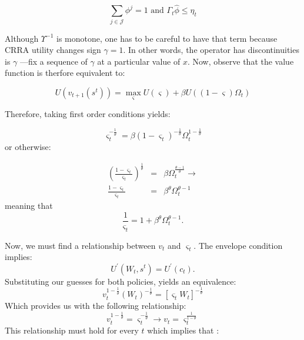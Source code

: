 \documentclass{article}
\begin{document}
\begin{equation*}
\sum_{j\in \mathcal{J}}\phi ^{j}=1\text{ and }\Gamma _{t}\hat{\phi}\leq \eta
_{t}
\end{equation*}

Although $\Upsilon ^{-1}$ is monotone, one has to be careful to have that
term because CRRA utility changes sign $\gamma =1$. In other words, the
operator has discontinuities is $\gamma $ ---fix a sequence of $\gamma $ at
a particular value of $x$. Now, observe that the value function is therfore
equivalent to:

\begin{equation*}
U\left( v_{t+1}\left( s^{t}\right) \right) =\max_{\varsigma }U\left(
\varsigma \right) +\beta U\left( \left( 1-\varsigma \right) \Omega
_{t}\right)
\end{equation*}

Therefore, taking first order conditions yields:

\begin{equation*}
\varsigma _{t}^{-\frac{1}{\theta }}=\beta \left( 1-\varsigma _{t}\right) ^{-%
\frac{1}{\theta }}\Omega _{t}^{1-\frac{1}{\theta }}
\end{equation*}%
or otherwise:

\begin{eqnarray*}
\left( \frac{1-\varsigma _{t}}{\varsigma _{t}}\right) ^{\frac{1}{\theta }}
&=&\beta \Omega _{t}^{\frac{\theta -1}{\theta }}\rightarrow \\
\frac{1-\varsigma _{t}}{\varsigma _{t}} &=&\beta ^{\theta }\Omega
_{t}^{\theta -1}
\end{eqnarray*}%
meaning that
\begin{equation*}
\frac{1}{\varsigma _{t}}=1+\beta ^{\theta }\Omega _{t}^{\theta -1}.
\end{equation*}

Now, we must find a relationship between $v_{t}$ and $\varsigma _{t}$. The
envelope condition implies:%
\begin{equation*}
U^{\prime }\left( W_{t},s^{t}\right) =U^{\prime }\left( c_{t}\right) .
\end{equation*}%
Substituting our guesses for both policies, yields an equivalence:%
\begin{equation*}
v_{t}^{1-\frac{1}{\theta }}\left( W_{t}\right) ^{-\frac{1}{\theta }}=\left[
\varsigma _{t}W_{t}\right] ^{-\frac{1}{\theta }}
\end{equation*}%
Which provides us with the following relationship:%
\begin{equation*}
v_{t}^{1-\frac{1}{\theta }}=\varsigma _{t}^{-\frac{1}{\theta }}\rightarrow
v_{t}=\varsigma _{t}^{\frac{1}{1-\theta }}
\end{equation*}%
This relationship must hold for every $t$ which implies that :
\end{document}
